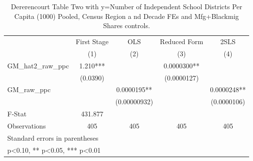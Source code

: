 \begin{table}[htbp]\centering
\def\sym#1{\ifmmode^{#1}\else\(^{#1}\)\fi}
\caption{Dererencourt Table Two with y=Number of Independent School Districts Per Capita (1000) Pooled, Census Region a nd Decade FEs and Mfg+Blackmig Shares controls.}
\begin{tabular}{l*{4}{c}}
\toprule
                    & First Stage   &         OLS   &Reduced Form   &        2SLS   \\
                    &\multicolumn{1}{c}{(1)}   &\multicolumn{1}{c}{(2)}   &\multicolumn{1}{c}{(3)}   &\multicolumn{1}{c}{(4)}   \\
\midrule
GM\_hat2\_raw\_ppc     &       1.210***&               &   0.0000300** &               \\
                    &    (0.0390)   &               & (0.0000127)   &               \\
\addlinespace
GM\_raw\_ppc          &               &   0.0000195** &               &   0.0000248** \\
                    &               &(0.00000932)   &               & (0.0000106)   \\
\midrule
F-Stat              &     431.877   &               &               &               \\
Observations        &         405   &         405   &         405   &         405   \\
\bottomrule
\multicolumn{5}{l}{\footnotesize Standard errors in parentheses}\\
\multicolumn{5}{l}{\footnotesize * p<0.10, ** p<0.05, *** p<0.01}\\
\end{tabular}
\end{table}
